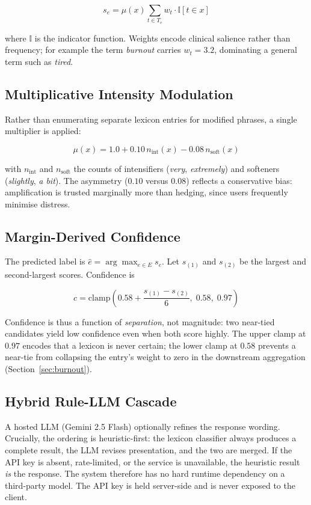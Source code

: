 \documentclass[runningheads]{llncs}
\begin{document}
\begin{equation}
s_e = \mu(x) \sum_{t \in T_e} w_t \cdot \mathbb{I}[t \in x]
\end{equation}

where $\mathbb{I}$ is the indicator function. Weights encode clinical salience
rather than frequency; for example the term \textit{burnout} carries
$w_t = 3.2$, dominating a general term such as \textit{tired}.

\subsection{Multiplicative Intensity Modulation}
Rather than enumerating separate lexicon entries for modified phrases, a single
multiplier is applied:

\begin{equation}
\mu(x) = 1.0 + 0.10\,n_{\text{int}}(x) - 0.08\,n_{\text{soft}}(x)
\end{equation}

with $n_{\text{int}}$ and $n_{\text{soft}}$ the counts of intensifiers
(\textit{very}, \textit{extremely}) and softeners (\textit{slightly},
\textit{a bit}). The asymmetry ($0.10$ versus $0.08$) reflects a conservative
bias: amplification is trusted marginally more than hedging, since users
frequently minimise distress.

\subsection{Margin-Derived Confidence}
The predicted label is $\hat{e} = \arg\max_{e \in E} s_e$. Let $s_{(1)}$ and
$s_{(2)}$ be the largest and second-largest scores. Confidence is

\begin{equation}
c = \mathrm{clamp}\!\left(0.58 + \frac{s_{(1)} - s_{(2)}}{6},\; 0.58,\; 0.97\right)
\label{eq:conf}
\end{equation}

Confidence is thus a function of \emph{separation}, not magnitude: two
near-tied candidates yield low confidence even when both score highly. The
upper clamp at $0.97$ encodes that a lexicon is never certain; the lower clamp
at $0.58$ prevents a near-tie from collapsing the entry's weight to zero in
the downstream aggregation (Section~\ref{sec:burnout}).

\subsection{Hybrid Rule-LLM Cascade}
A hosted LLM (Gemini 2.5 Flash) optionally refines the response wording.
Crucially, the ordering is heuristic-first: the lexicon classifier always
produces a complete result, the LLM revises presentation, and the two are
merged. If the API key is absent, rate-limited, or the service is unavailable,
the heuristic result \emph{is} the response. The system therefore has no hard
runtime dependency on a third-party model. The API key is held server-side and
is never exposed to the client.
\end{document}
